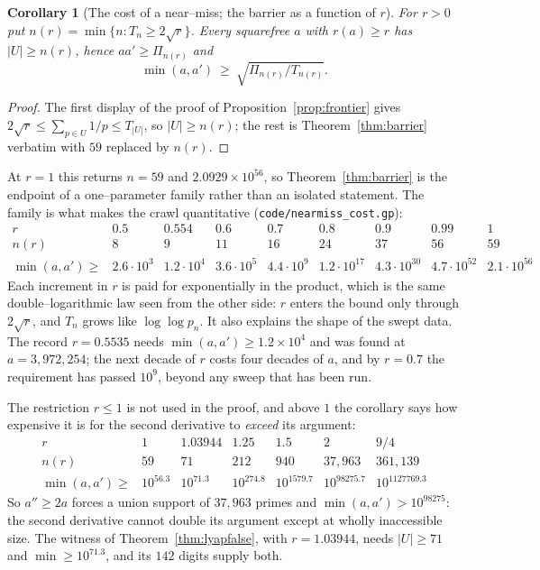 \documentclass[11pt]{article}
\newtheorem{corollary}[theorem]{Corollary}
\theoremstyle{definition}
\begin{document}
\begin{corollary}[The cost of a near--miss; the barrier as a function of $r$]\label{cor:cost}
For $r>0$ put $n(r)=\min\{n:T_n\ge2\sqrt r\}$. Every squarefree $a$ with $r(a)\ge r$ has
$|U|\ge n(r)$, hence $aa'\ge\Pi_{n(r)}$ and
\[ \min(a,a')\ \ge\ \sqrt{\Pi_{n(r)}/T_{n(r)}}. \]
\end{corollary}
\begin{proof}
The first display of the proof of Proposition~\ref{prop:frontier} gives $2\sqrt r\le\sum_{p\in U}1/p
\le T_{|U|}$, so $|U|\ge n(r)$; the rest is Theorem~\ref{thm:barrier} verbatim with $59$ replaced by
$n(r)$.
\end{proof}

At $r=1$ this returns $n=59$ and $2.0929\times10^{56}$, so Theorem~\ref{thm:barrier} is the endpoint
of a one--parameter family rather than an isolated statement. The family is what makes the crawl
quantitative \textup{(\texttt{code/nearmiss\_cost.gp})}:
\[
\begin{array}{l|cccccccc}
r & 0.5 & 0.554 & 0.6 & 0.7 & 0.8 & 0.9 & 0.99 & 1\\\hline
n(r) & 8 & 9 & 11 & 16 & 24 & 37 & 56 & 59\\
\min(a,a')\ge & 2.6\!\cdot\!10^{3} & 1.2\!\cdot\!10^{4} & 3.6\!\cdot\!10^{5} & 4.4\!\cdot\!10^{9} &
 1.2\!\cdot\!10^{17} & 4.3\!\cdot\!10^{30} & 4.7\!\cdot\!10^{52} & 2.1\!\cdot\!10^{56}
\end{array}
\]
Each increment in $r$ is paid for exponentially in the product, which is the same double--logarithmic
law seen from the other side: $r$ enters the bound only through $2\sqrt r$, and $T_n$ grows like
$\log\log p_n$. It also explains the shape of the swept data. The record $r=0.5535$ needs
$\min(a,a')\ge1.2\times10^{4}$ and was found at $a=3{,}972{,}254$; the next decade of $r$ costs four
decades of $a$, and by $r=0.7$ the requirement has passed $10^{9}$, beyond any sweep that has been
run.

The restriction $r\le1$ is not used in the proof, and above $1$ the corollary says how expensive it
is for the second derivative to \emph{exceed} its argument:
\[
\begin{array}{l|cccccc}
r & 1 & 1.03944 & 1.25 & 1.5 & 2 & 9/4\\\hline
n(r) & 59 & 71 & 212 & 940 & 37{,}963 & 361{,}139\\
\min(a,a')\ge & 10^{56.3} & 10^{71.3} & 10^{274.8} & 10^{1579.7} & 10^{98275.7} & 10^{1127769.3}
\end{array}
\]
So $a''\ge2a$ forces a union support of $37{,}963$ primes and $\min(a,a')>10^{98275}$: the second
derivative cannot double its argument except at wholly inaccessible size. The witness of
Theorem~\ref{thm:lyapfalse}, with $r=1.03944$, needs $|U|\ge71$ and $\min\ge10^{71.3}$, and its $142$
digits supply both.
\end{document}
